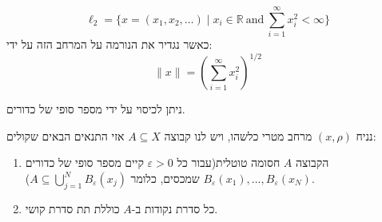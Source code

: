 \documentclass{tstextbook}
\begin{document}
\begin{definition}
$$\ell_{2}={\Bigg\{}x=\left(x_{1},x_{2},\dots\right)\mid x_{i}\in\mathbb{R}{\mathrm{~and~}}\sum_{i=1}^{\infty}x_{i}^{2}<\infty{\Bigg\}}$$
כאשר נגדיר את הנורמה על המרחב הזה על ידי:
$$\|x\|=\left(\sum_{i=1}^{\infty}x_{i}^{2}\right)^{1/2}$$

\end{definition}
\begin{definition}
ניתן לכיסוי על ידי מספר סופי של כדורים.

\end{definition}
\begin{theorem}
נניח \((x,\rho)\) מרחב מטרי כלשהו, ויש לנו קבוצה \(A\subseteq X\) אזי התנאים הבאים שקולים:

  \begin{enumerate}
    \item הקבוצה \(A\) חסומה טוטלית(עבור כל \(\varepsilon> 0\) קיים מספר סופי של כדורים \(B_{\varepsilon}(x_{1}),\dots,B_{\varepsilon}(x_{N})\) שמכסים, כלומר \(A\subseteq \bigcup_{j=1}^{N}B_{\varepsilon}(x_{j})\)). 


    \item כל סדרת נקודות ב-\(A\) כוללת תת סדרת קושי. 


  \end{enumerate}
\end{theorem}
\end{document}
